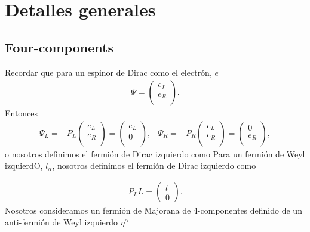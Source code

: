 \chapter{Detalles generales}

\section{Four-components}
Recordar que para un espinor de Dirac como el electrón, $e$
\begin{align}
\Psi=\begin{pmatrix}
e_L\\
e_R\\
\end{pmatrix}.
\end{align}
Entonces
\begin{align}
\Psi_L=&P_L\begin{pmatrix}
e_L\\
e_R\\
\end{pmatrix}=\begin{pmatrix}
e_L\\
0\\
\end{pmatrix},&
\Psi_R=&P_R\begin{pmatrix}
e_L\\
e_R\\
\end{pmatrix}=\begin{pmatrix}
0\\
e_R\\
\end{pmatrix},
\end{align}
o nosotros definimos el fermión de Dirac izquierdo como 
Para un fermión de Weyl izquierdO, $l_{\alpha}$, nosotros definimos el fermión de Dirac izquierdo como 

\begin{align}
\label{eq:fc1}
 P_L L=\begin{pmatrix}
l\\
0
\end{pmatrix}.
\end{align}
Nosotros consideramos un fermión de Majorana de 4-componentes definido de un anti-fermión de Weyl izquierdo $\eta^{\alpha}$

